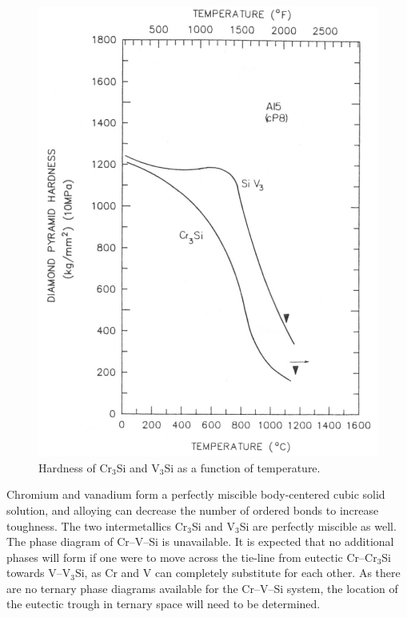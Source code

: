 \begin{figure}[H]
\begin{center}
\includegraphics{VCr3Si_hardness}
\caption{Hardness of Cr$_3$Si and V$_3$Si as a function of temperature.}
\label{fig:VCr_hardness}
\end{center}
\end{figure}
%
Chromium and vanadium form a perfectly miscible body-centered cubic solid solution, and alloying can decrease the number of ordered bonds to increase toughness. The two intermetallics Cr$_3$Si and V$_3$Si are perfectly miscible as well. The phase diagram of Cr--V--Si is unavailable. It is expected that no additional phases will form if one were to move across the tie-line from eutectic Cr--Cr$_3$Si towards V--V$_3$Si, as Cr and V can completely substitute for each other. As there are no ternary phase diagrams available for the Cr--V--Si system, the location of the eutectic trough in ternary space will need to be determined.
%
